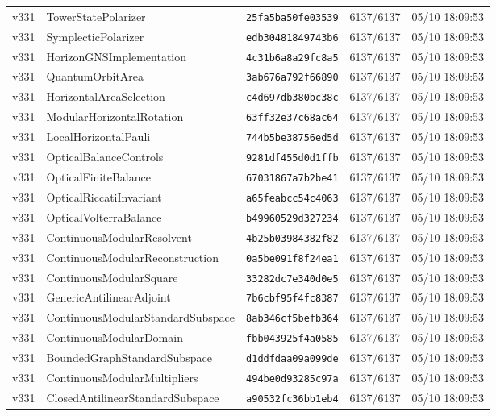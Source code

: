 \documentclass[11pt]{article}
\theoremstyle{definition}\newtheorem{deriv}{Derivation}
\begin{document}
{\begin{longtable}{@{}lllll@{}}
v331 & TowerStatePolarizer & \texttt{25fa5ba50fe03539} & 6137/6137 & 05/10 18:09:53 \\
v331 & SymplecticPolarizer & \texttt{edb30481849743b6} & 6137/6137 & 05/10 18:09:53 \\
v331 & HorizonGNSImplementation & \texttt{4c31b6a8a29fc8a5} & 6137/6137 & 05/10 18:09:53 \\
v331 & QuantumOrbitArea & \texttt{3ab676a792f66890} & 6137/6137 & 05/10 18:09:53 \\
v331 & HorizontalAreaSelection & \texttt{c4d697db380bc38c} & 6137/6137 & 05/10 18:09:53 \\
v331 & ModularHorizontalRotation & \texttt{63ff32e37c68ac64} & 6137/6137 & 05/10 18:09:53 \\
v331 & LocalHorizontalPauli & \texttt{744b5be38756ed5d} & 6137/6137 & 05/10 18:09:53 \\
v331 & OpticalBalanceControls & \texttt{9281df455d0d1ffb} & 6137/6137 & 05/10 18:09:53 \\
v331 & OpticalFiniteBalance & \texttt{67031867a7b2be41} & 6137/6137 & 05/10 18:09:53 \\
v331 & OpticalRiccatiInvariant & \texttt{a65feabcc54c4063} & 6137/6137 & 05/10 18:09:53 \\
v331 & OpticalVolterraBalance & \texttt{b49960529d327234} & 6137/6137 & 05/10 18:09:53 \\
v331 & ContinuousModularResolvent & \texttt{4b25b03984382f82} & 6137/6137 & 05/10 18:09:53 \\
v331 & ContinuousModularReconstruction & \texttt{0a5be091f8f24ea1} & 6137/6137 & 05/10 18:09:53 \\
v331 & ContinuousModularSquare & \texttt{33282dc7e340d0e5} & 6137/6137 & 05/10 18:09:53 \\
v331 & GenericAntilinearAdjoint & \texttt{7b6cbf95f4fc8387} & 6137/6137 & 05/10 18:09:53 \\
v331 & ContinuousModularStandardSubspace & \texttt{8ab346cf5befb364} & 6137/6137 & 05/10 18:09:53 \\
v331 & ContinuousModularDomain & \texttt{fbb043925f4a0585} & 6137/6137 & 05/10 18:09:53 \\
v331 & BoundedGraphStandardSubspace & \texttt{d1ddfdaa09a099de} & 6137/6137 & 05/10 18:09:53 \\
v331 & ContinuousModularMultipliers & \texttt{494be0d93285c97a} & 6137/6137 & 05/10 18:09:53 \\
v331 & ClosedAntilinearStandardSubspace & \texttt{a90532fc36bb1eb4} & 6137/6137 & 05/10 18:09:53 \\

\end{longtable}}
\end{document}
